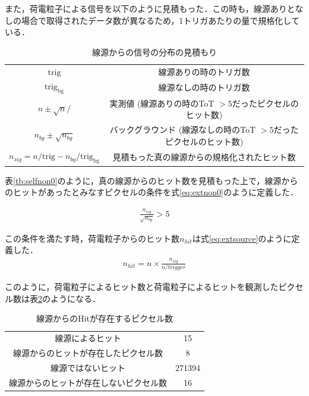 また，荷電粒子による信号を以下のように見積もった．この時も，線源ありとなしの場合で取得されたデータ数が異なるため，1トリガあたりの量で規格化している．
\begin{table}[h]
  \centering
  \caption{線源からの信号の分布の見積もり}
  \label{tb:extnon0}
  \begin{tabular}{cc} \hline
    $\mathrm{trig}$ & 線源ありの時のトリガ数 \\
    $\mathrm{trig_{bg}}$ & 線源なしの時のトリガ数 \\
    $n \pm \sqrt{n} /$ & 実測値  (線源ありの時のToT $>5$だったピクセルのヒット数) \\
    $n_{bg} \pm \sqrt{n_{bg}}$ & バックグラウンド  (線源なしの時のToT $>5$だったピクセルのヒット数)\\
    $n_{sig} = n/\mathrm{trig} - n_{bg}/\mathrm{trig_{bg}}$ & 見積もった真の線源からの規格化されたヒット数 \\ \hline
  \end{tabular}
\end{table}

表\ref{tb:selfnon0}のように，真の線源からのヒット数を見積もった上で，線源からのヒットがあったとみなすピクセルの条件を式\ref{eq:extnon0}のように定義した．

\begin{eqnarray}
  \label{eq:extnon0}
  \frac{n_{sig}}{\sqrt{n_{bg}}} > 5
\end{eqnarray}

この条件を満たす時，荷電粒子からのヒット数$n_{hit}$は式\ref{eq:extsource}のように定義した．
\begin{eqnarray}
  \label{eq:extnon0}
  n_{hit} = n \times \frac{n_{sig}}{n/trigger}
\end{eqnarray}

このように，荷電粒子によるヒット数と荷電粒子によるヒットを観測したピクセル数は表\ref{tab:extnon0}のようになる．
\begin{table}
  \centering
  \caption{線源からのHitが存在するピクセル数}
  \label{tab:extnon0}
  \begin{tabular}{cc}\hline
    線源によるヒット & 15 \\
    線源からのヒットが存在したピクセル数 & 8 \\ 
    線源ではないヒット &  271394\\
    線源からのヒットが存在しないピクセル数 & 16 \\ \hline
  \end{tabular}
\end{table}



